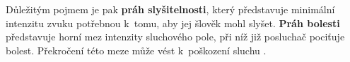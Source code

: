 



Důležitým pojmem je pak \textbf{práh slyšitelnosti}, který představuje minimální intenzitu zvuku potřebnou  k~tomu, aby jej šlověk mohl slyšet.
\textbf{Práh bolesti} představuje horní mez intenzity sluchového pole,
při níž již posluchač pociťuje bolest. Překročení této meze může vést  k~poškození sluchu \cite{Holmes2001}.



